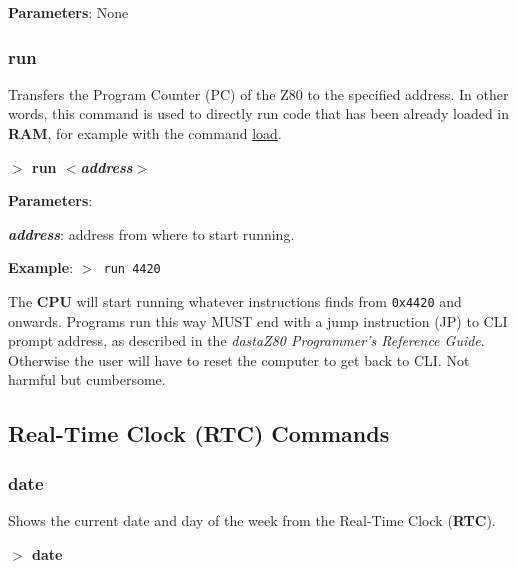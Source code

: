         \textbf{Parameters}: None

        \subsubsection{{run}}
        \label{cmd:run}

        Transfers the Program Counter (PC) of the Z80 to the specified address.
        In other words, this command is used to directly run code that has been
        already loaded in \textbf{RAM}, for example with the command 
        \hyperref[cmd:load]{load}.

        \hspace{1.9cm}\textbf{$>$ run \textit{$<$address$>$}}

        \textbf{Parameters}:

        \hspace{1cm}\textbf{\textit{address}}: address from where to start
        running.
        
        \textbf{Example}: \texttt{$>$ run 4420}

        The \textbf{CPU} will start running whatever instructions finds from
        \texttt{0x4420} and onwards. Programs run this way MUST end with a
        jump instruction (JP) to CLI prompt address, as described in the
        \textit{dastaZ80 Programmer’s Reference Guide}\cite{dastaz80progref}.
        Otherwise the user will have to reset the computer to get back to CLI.
        Not harmful but cumbersome.

    \subsection{Real-Time Clock (RTC) Commands}
        \subsubsection{{date}}
        Shows the current date and day of the week from the Real-Time Clock
        (\textbf{RTC}).

        \hspace{1.9cm}\textbf{$>$ date}

